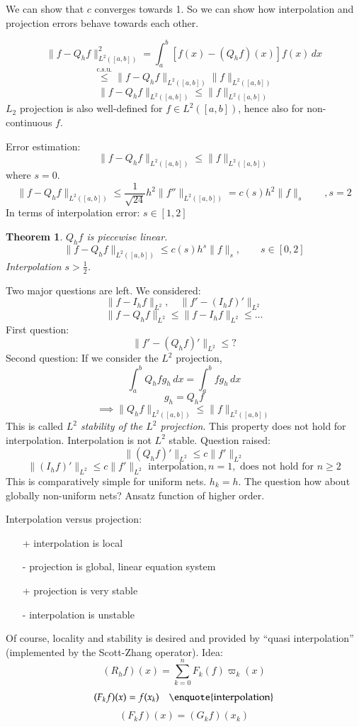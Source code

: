 \documentclass{article}
\newtheorem{theorem}{Theorem}
\begin{document}
We can show that $c$ converges towards 1.
So we can show how interpolation and projection errors behave towards each other.

\[ \|f - Q_h f \|^2_{L^2([a,b])} = \int_a^b [f(x) - (Q_h f)(x)] f(x) \, dx \]
\[ \stackrel{\text{c.s.u.}}{\leq} \| f - Q_h f \|_{L^2([a,b])} \|f\|_{L^2([a,b])} \]
\[ \|f - Q_h f\|_{L^2([a,b])} \leq \|f\|_{L^2([a,b])} \]
$L_2$ projection is also well-defined for $f \in L^2([a,b])$,
hence also for non-continuous $f$. %

Error estimation:
\[ \| f - Q_h f \|_{L^2([a,b])} \leq \| f \|_{L^2([a,b])} \]
where $s = 0$.
\[ \| f - Q_h f \|_{L^2([a,b])} \leq \frac{1}{\sqrt{24}} h^2 \|f''\|_{L^2([a,b])} = c(s) h^2 \|f\|_s \qquad ,s = 2 \]
In terms of interpolation error: $s \in [1,2]$

\begin{theorem}
  $Q_h f$ is piecewise linear.
  \[ \| f - Q_h f \|_{L^2([a,b])} \leq c(s) h^s \|f\|_s, \qquad s \in [0,2] \]
  Interpolation $s > \frac12$.
\end{theorem}

Two major questions are left. We considered:
\[ \| f - I_h f \|_{L^2}, \quad \| f' - (I_h f)' \|_{L^2} \]
\[ \| f - Q_h f \|_{L^2} \leq \| f - I_h f \|_{L^2} \leq \ldots \]
First question:
\[ \| f' - (Q_h f)' \|_{L^2} \leq ? \]
Second question:
If we consider the $L^2$ projection,
\[ \int_a^b Q_h f g_h \, dx = \int_a^b f g_h \, dx \]
\[ g_h = Q_h f \]
\[ \implies \| Q_h f \|_{L^2([a,b])} \leq \| f \|_{L^2([a,b])} \]
This is called \emph{$L^2$ stability of the $L^2$ projection}.
This property does not hold for interpolation.
Interpolation is not $L^2$ stable.
Question raised:
\[ \|(Q_h f)'\|_{L^2} \leq c \| f' \|_{L^2} \]
\[ \|(I_h f)'\|_{L^2} \leq c \|f'\|_{L^2} \text{ interpolation}, n=1, \text{ does not hold for } n \geq 2 \]
This is comparatively simple for uniform nets. $h_k = h$.
The question how about globally non-uniform nets?
Ansatz function of higher order. %

Interpolation versus projection:
\begin{itemize}
  \item[+] interpolation is local
  \item[-] projection is global, linear equation system
  \item[+] projection is very stable
  \item[-] interpolation is unstable
\end{itemize}
Of course, locality and stability is desired and provided by \enquote{quasi interpolation} (implemented by the Scott-Zhang operator).
Idea:
\[ (R_h f)(x) = \sum_{k=0}^n F_k(f) \varpi_k(x) \]
\[ (F_k f)(x) = f(x_k) \quad \text{\enquote{interpolation}} \]
\[ (F_k f)(x) = (G_k f)(x_k) \]
\end{document}

